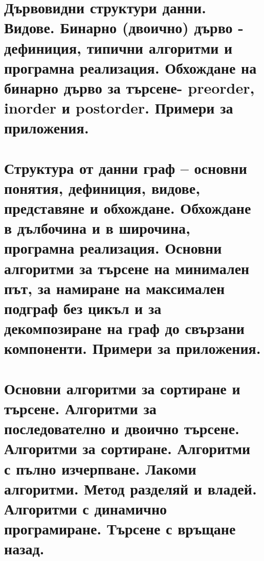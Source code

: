 \chapter{Дървовидни структури данни. Видове. Бинарно (двоично) дърво - дефиниция,
типични алгоритми и програмна реализация. Обхождане на бинарно дърво за
търсене- preorder, inorder и postorder. Примери за приложения.}
\chapter{Структура от данни граф – основни понятия, дефиниция, видове, представяне и
обхождане. Обхождане в дълбочина и в широчина, програмна реализация.
Основни алгоритми за търсене на минимален път, за намиране на максимален
подграф без цикъл и за декомпозиране на граф до свързани компоненти.
Примери за приложения.}
\chapter{Основни алгоритми за сортиране и търсене. Алгоритми за последователно и
двоично търсене. Алгоритми за сортиране. Алгоритми с пълно изчерпване.
Лакоми алгоритми. Метод разделяй и владей. Алгоритми с динамично
програмиране. Търсене с връщане назад.}